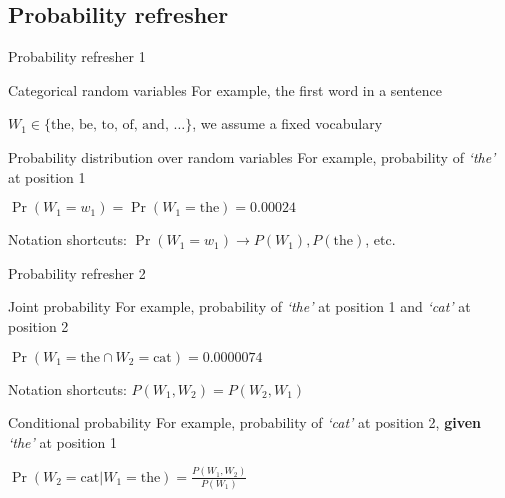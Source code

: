 \documentclass[12pt,aspectratio=169,handout]{beamer}
\begin{document}
\subsection{Probability refresher}


\begin{frame}{Probability refresher 1}
	
\begin{block}{Categorical random variables}
	For example, the first word in a sentence
	
	$W_1 \in \{ \textrm{the, be, to, of, and, } \ldots \}$, we assume a fixed vocabulary
\end{block}

\pause

\begin{block}{Probability distribution over random variables}
	For example, probability of \emph{`the'} at position 1
	
	$\Pr(W_1 = w_1) = \Pr(W_1 = \text{the}) = 0.00024$
	
	\pause
	
	Notation shortcuts: $\Pr(W_1 = w_1) \to P(W_1), P(\text{the})$, etc.
\end{block}
	
\end{frame}


\begin{frame}{Probability refresher 2}
	
	
	\begin{block}{Joint probability}
		For example, probability of \emph{`the'} at position 1 and \emph{`cat'} at position 2
		
		$\Pr(W_1 = \text{the} \cap W_2 = \text{cat}) = 0.0000074$
		
		\pause
		
		Notation shortcuts: $P(W_1, W_2) = P(W_2, W_1)$
	\end{block}
	
	\pause
	
	\begin{block}{Conditional probability}
		For example, probability of \emph{`cat'} at position 2, \textbf{given} \emph{`the'} at position 1
		
		$\Pr(W_2 = \text{cat} | W_1 = \text{the} ) = \frac{P(W_1, W_2)}{P(W_1)}$
	\end{block}
	
\end{frame}
\end{document}

